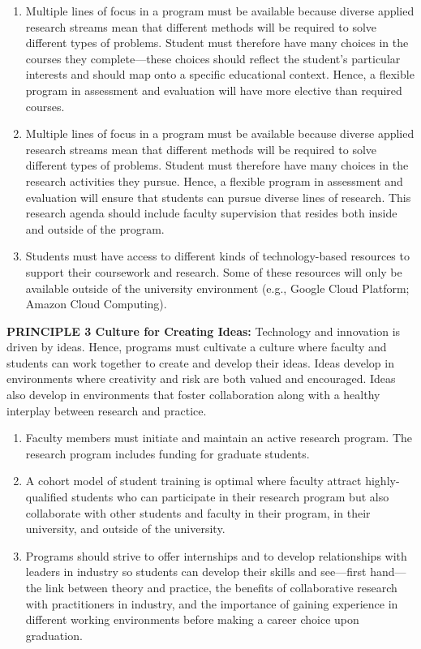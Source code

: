 \documentclass[
]{book}
\begin{document}
\begin{enumerate}
\def\labelenumi{\arabic{enumi}.}
\item
  Multiple lines of focus in a program must be available because diverse applied research streams mean that different methods will be required to solve different types of problems. Student must therefore have many choices in the courses they complete---these choices should reflect the student's particular interests and should map onto a specific educational context. Hence, a flexible program in assessment and evaluation will have more elective than required courses.
\item
  Multiple lines of focus in a program must be available because diverse applied research streams mean that different methods will be required to solve different types of problems. Student must therefore have many choices in the research activities they pursue. Hence, a flexible program in assessment and evaluation will ensure that students can pursue diverse lines of research. This research agenda should include faculty supervision that resides both inside and outside of the program.
\item
  Students must have access to different kinds of technology-based resources to support their coursework and research. Some of these resources will only be available outside of the university environment (e.g., Google Cloud Platform; Amazon Cloud Computing).
\end{enumerate}

\textbf{PRINCIPLE 3 Culture for Creating Ideas:} Technology and innovation is driven by ideas. Hence, programs must cultivate a culture where faculty and students can work together to create and develop their ideas. Ideas develop in environments where creativity and risk are both valued and encouraged. Ideas also develop in environments that foster collaboration along with a healthy interplay between research and practice.

\begin{enumerate}
\def\labelenumi{\arabic{enumi}.}
\item
  Faculty members must initiate and maintain an active research program. The research program includes funding for graduate students.
\item
  A cohort model of student training is optimal where faculty attract highly-qualified students who can participate in their research program but also collaborate with other students and faculty in their program, in their university, and outside of the university.
\item
  Programs should strive to offer internships and to develop relationships with leaders in industry so students can develop their skills and see---first hand---the link between theory and practice, the benefits of collaborative research with practitioners in industry, and the importance of gaining experience in different working environments before making a career choice upon graduation.
\end{enumerate}
\end{document}
